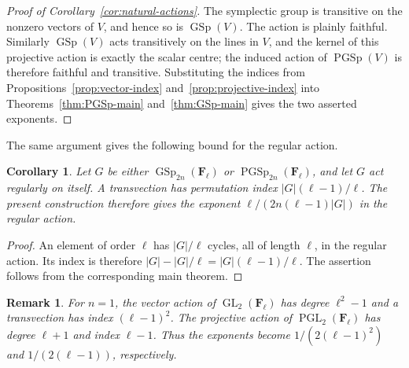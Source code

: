 \documentclass[11pt,hidelinks]{amsart}
\newtheorem{corollary}[theorem]{Corollary}
\newtheorem{remark}[theorem]{Remark}
\newcommand{\F}{\mathbf F}
\newcommand{\GL}{\operatorname{GL}}
\newcommand{\PGL}{\operatorname{PGL}}
\newcommand{\GSp}{\operatorname{GSp}}
\newcommand{\PGSp}{\operatorname{PGSp}}
\begin{document}
\begin{proof}[Proof of Corollary~\ref{cor:natural-actions}]
The symplectic group is transitive on the nonzero vectors of $V$, and hence so is $\GSp(V)$. The action is plainly faithful. Similarly $\GSp(V)$ acts transitively on the lines in $V$, and the kernel of this projective action is exactly the scalar centre; the induced action of $\PGSp(V)$ is therefore faithful and transitive. Substituting the indices from Propositions~\ref{prop:vector-index} and~\ref{prop:projective-index} into Theorems~\ref{thm:PGSp-main} and~\ref{thm:GSp-main} gives the two asserted exponents.
\end{proof}

The same argument gives the following bound for the regular action.

\begin{corollary}\label{cor:regular}
Let $G$ be either $\GSp_{2n}(\F_\ell)$ or $\PGSp_{2n}(\F_\ell)$, and let $G$ act regularly on itself. A transvection has permutation index $|G|(\ell-1)/\ell$. The present construction therefore gives the exponent $\ell/(2n(\ell-1)|G|)$ in the regular action.
\end{corollary}

\begin{proof}
An element of order $\ell$ has $|G|/\ell$ cycles, all of length $\ell$, in the regular action. Its index is therefore $|G|-|G|/\ell=|G|(\ell-1)/\ell$. The assertion follows from the corresponding main theorem.
\end{proof}

\begin{remark}\label{rem:n1}
For $n=1$, the vector action of $\GL_2(\F_\ell)$ has degree $\ell^2-1$ and a transvection has index $(\ell-1)^2$. The projective action of $\PGL_2(\F_\ell)$ has degree $\ell+1$ and index $\ell-1$. Thus the exponents become $1/(2(\ell-1)^2)$ and $1/(2(\ell-1))$, respectively.
\end{remark}





\end{document}
